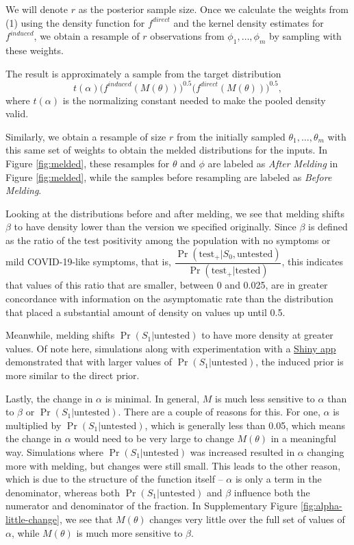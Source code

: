 \documentclass[12pt,twoside]{smiththesis}
\begin{document}
We will denote \(r\) as the posterior sample size. Once we calculate the weights from (1) using the density function for \(f^{direct}\) and the kernel density estimates for \(f^{induced}\), we obtain a resample of \(r\) observations from \(\phi_1,\dots,\phi_m\) by sampling with these weights.

The result is approximately a sample from the target distribution \[t(\alpha) \Big( f^{induced}(M(\theta)) \Big)^{0.5} \Big( f^{direct} (M(\theta)) \Big)^{0.5},\] where \(t(\alpha)\) is the normalizing constant needed to make the pooled density valid.

Similarly, we obtain a resample of size \(r\) from the initially sampled \(\theta_1, \dots, \theta_m\) with this same set of weights to obtain the melded distributions for the inputs. In Figure \ref{fig:melded}, these resamples for \(\theta\) and \(\phi\) are labeled as \emph{After Melding} in Figure \ref{fig:melded}, while the samples before resampling are labeled as \emph{Before Melding}.

Looking at the distributions before and after melding, we see that melding shifts \(\beta\) to have density lower than the version we specified originally. Since \(\beta\) is defined as the ratio of the test positivity among the population with no symptoms or mild COVID-19-like symptoms, that is, \(\dfrac{\Pr(\text{test}_+|S_0,\text{untested})}{\Pr(\text{test}_+|\text{tested})}\), this indicates that values of this ratio that are smaller, between 0 and 0.025, are in greater concordance with information on the asymptomatic rate than the distribution that placed a substantial amount of density on values up until 0.5.

Meanwhile, melding shifts \(\Pr(S_1|\text{untested})\) to have more density at greater values. Of note here, simulations along with experimentation with a \href{https://q-w-a.shinyapps.io/bayesian_melding_priors/}{Shiny app} demonstrated that with larger values of \(\Pr(S_1|\text{untested})\), the induced prior is more similar to the direct prior.

Lastly, the change in \(\alpha\) is minimal. In general, \(M\) is much less sensitive to \(\alpha\) than to \(\beta\) or \(\Pr(S_1|\text{untested})\). There are a couple of reasons for this. For one, \(\alpha\) is multiplied by \(\Pr(S_1|\text{untested})\), which is generally less than 0.05, which means the change in \(\alpha\) would need to be very large to change \(M(\theta)\) in a meaningful way. Simulations where \(\Pr(S_1|\text{untested})\) was increased resulted in \(\alpha\) changing more with melding, but changes were still small. This leads to the other reason, which is due to the structure of the function itself -- \(\alpha\) is only a term in the denominator, whereas both \(\Pr(S_1|\text{untested})\) and \(\beta\) influence both the numerator and denominator of the fraction. In Supplementary Figure \ref{fig:alpha-little-change}, we see that \(M(\theta)\) changes very little over the full set of values of \(\alpha\), while \(M(\theta)\) is much more sensitive to \(\beta\).
\end{document}
